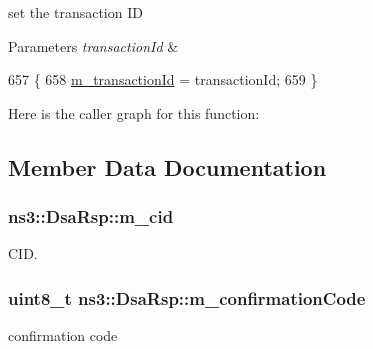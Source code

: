 set the transaction ID 


\begin{DoxyParams}{Parameters}
{\em transaction\+Id} & \\
\hline
\end{DoxyParams}

\begin{DoxyCode}
657 \{
658   \hyperlink{classns3_1_1DsaRsp_a65c30343bc903c7df3f78bf96e6c7929}{m\_transactionId} = transactionId;
659 \}
\end{DoxyCode}


Here is the caller graph for this function\+:




\subsection{Member Data Documentation}
\subsubsection[{\texorpdfstring{m\+\_\+cid}{m_cid}}]{ ns3\+::\+Dsa\+Rsp\+::m\+\_\+cid\hspace{0.3cm}{\ttfamily [private]}}\hypertarget{classns3_1_1DsaRsp_abf09a834ae78fa7d5464611ce2d2bbd9}{}\label{classns3_1_1DsaRsp_abf09a834ae78fa7d5464611ce2d2bbd9}


C\+ID. 

\subsubsection[{\texorpdfstring{m\+\_\+confirmation\+Code}{m_confirmationCode}}]{\setlength{\rightskip}{0pt plus 5cm}uint8\+\_\+t ns3\+::\+Dsa\+Rsp\+::m\+\_\+confirmation\+Code\hspace{0.3cm}{\ttfamily [private]}}\hypertarget{classns3_1_1DsaRsp_ae273d2a96203b9e984690cedaabde067}{}\label{classns3_1_1DsaRsp_ae273d2a96203b9e984690cedaabde067}


confirmation code 

